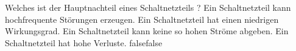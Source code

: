     {Welches ist der Hauptnachteil eines Schaltnetzteils ?}
    {Ein Schaltnetzteil kann hochfrequente Störungen erzeugen.}
    {Ein Schaltnetzteil hat einen niedrigen Wirkungsgrad.}
    {Ein Schaltnetzteil kann keine so hohen Ströme abgeben.}
    {Ein Schaltnetzteil hat hohe Verluste.}
    {false}{false}